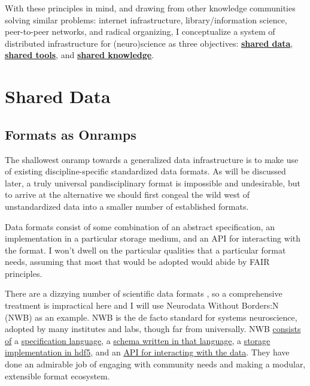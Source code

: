 With these principles in mind, and drawing from other knowledge
communities solving similar problems: internet infrastructure,
library/information science, peer-to-peer networks, and radical
organizing, I conceptualize a system of distributed infrastructure for
(neuro)science as three objectives:
\protect\hyperlink{shared-data}{\textbf{shared data}},
\protect\hyperlink{shared-tools}{\textbf{shared tools}}, and
\protect\hyperlink{shared-knowledge}{\textbf{shared knowledge}}.

\hypertarget{shared-data}{%
\section{Shared Data}\label{shared-data}}

\hypertarget{formats-as-onramps}{%
\subsection{Formats as Onramps}\label{formats-as-onramps}}

The shallowest onramp towards a generalized data infrastructure is to
make use of existing discipline-specific standardized data formats. As
will be discussed later, a truly universal pandisciplinary format is
impossible and undesirable, but to arrive at the alternative we should
first congeal the wild west of unstandardized data into a smaller number
of established formats.

Data formats consist of some combination of an abstract specification,
an implementation in a particular storage medium, and an API for
interacting with the format. I won't dwell on the particular qualities
that a particular format needs, assuming that most that would be adopted
would abide by FAIR principles.

There are a dizzying number of scientific data formats \citep{teamScientificDataFormats} , so a comprehensive treatment is
impractical here and I will use Neurodata Without Borders:N (NWB)\citep{rubelNWBAccessibleData2019a}  as an example. NWB is the de facto
standard for systems neuroscience, adopted by many institutes and labs,
though far from universally. NWB
\href{https://www.nwb.org/nwb-software/}{consists of} a
\href{https://schema-language.readthedocs.io/en/stable/}{specification
language}, a \href{https://nwb-schema.readthedocs.io/en/stable/}{schema
written in that language}, a
\href{https://nwb-storage.readthedocs.io/en/stable/}{storage
implementation in hdf5}, and an
\href{https://pynwb.readthedocs.io/en/stable/}{API for interacting with
the data}. They have done an admirable job of engaging with community
needs \citep{rubelNeurodataBordersEcosystem2021}  and making a
modular, extensible format ecosystem.

